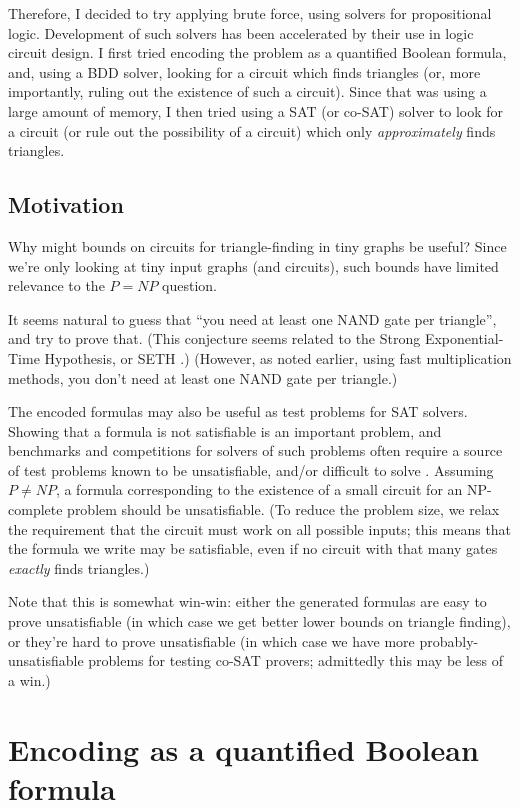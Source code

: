 \documentclass[12pt]{article}
\begin{document}
Therefore, I decided to try applying brute force, using solvers for propositional
logic. Development of such solvers has been accelerated by their use in logic
circuit design.
I first tried encoding the problem
as a quantified Boolean formula, and, using a BDD solver,
looking for a circuit which finds
triangles (or, more importantly, ruling out
the existence of such a circuit). Since that was using a large amount of memory,
I then tried using a SAT (or co-SAT) solver to look
for a circuit (or rule out the possibility of a circuit)
which only {\em approximately} finds triangles.

\subsection{Motivation}

Why might bounds on circuits for triangle-finding in tiny graphs be useful? Since we're
only looking at tiny input graphs (and circuits), such bounds have
limited relevance to the $P=NP$ question.

It seems natural to guess that ``you need at least one NAND gate per triangle'',
and try to prove that.
(This conjecture seems related to the Strong Exponential-Time Hypothesis, or SETH \cite{impagliazzo_complexity_1999}.)
(However, as noted earlier, using fast multiplication methods, you don't need
at least one NAND gate per triangle.)

The encoded formulas may also be useful as test problems for SAT solvers.
Showing that a formula is not satisfiable is an important problem, and
benchmarks and competitions for solvers of such
problems often require a source of
test problems known to be unsatisfiable, and/or difficult to solve \cite{toughsat}.
 Assuming $P \ne NP$,
a formula corresponding to the existence of a small circuit for an NP-complete
problem should be unsatisfiable. (To reduce the problem size, we relax the requirement
that the circuit must work on all possible inputs; this means that the formula we
write may be satisfiable, even if no circuit with that many gates {\em exactly}
finds triangles.)

Note that this is somewhat win-win: either the generated formulas are easy to
prove unsatisfiable (in which case we get better lower bounds on triangle finding),
or they're hard to prove unsatisfiable (in which case we have more probably-unsatisfiable
problems for testing co-SAT provers; admittedly this may be less of a win.)

\section{Encoding as a quantified Boolean formula}
\end{document}

